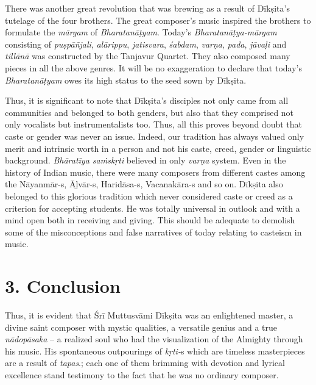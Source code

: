 There was another great revolution that was brewing as a result of Dīkṣita’s tutelage of the four brothers. The great composer’s music inspired the brothers to formulate the \textit{mārgam} of \textit{Bharatanāṭyam}. Today’s \textit{Bharatanāṭya-mārgam} consisting of \textit{puṣpāñjali}, \textit{alārippu}, \textit{jatisvara}, \textit{śabdam}, \textit{varṇa}, \textit{pada}, \textit{jāvaḷi} and \textit{tillānā} was constructed by the Tanjavur Quartet. They also composed many pieces in all the above genres. It will be no exaggeration to declare that today’s \textit{Bharatanāṭyam} owes its high status to the seed sown by Dīkṣita.

Thus, it is significant to note that Dīkṣita's disciples not only came from all communities and belonged to both genders, but also that they comprised not only vocalists but instrumentalists too. Thus, all this proves beyond doubt that caste or gender was never an issue. Indeed, our tradition has always valued only merit and intrinsic worth in a person and not his caste, creed, gender or linguistic background. \textit{Bhāratīya saṁskṛti} believed in only \textit{varṇa} system. Even in the history of Indian music, there were many composers from different castes among the Nāyanmār-s, Āḻvār-s, Haridāsa-s, Vacanakāra-s and so on. Dīkṣita also belonged to this glorious tradition which never considered caste or creed as a criterion for accepting students. He was totally universal in outlook and with a mind open both in receiving and giving. This should be adequate to demolish some of the misconceptions and false narratives of today relating to casteism in music.

\vspace{-.3cm}

\section*{3. Conclusion}

Thus, it is evident that Śrī Muttusvāmi Dīkṣita was an enlightened master, a divine saint composer with mystic qualities, a versatile genius and a true \textit{nādopāsaka} – a realized soul who had the visualization of the Almighty through his music. His spontaneous outpourings of \textit{kṛti-}s which are timeless masterpieces are a result of \textit{tapas}.; each one of them brimming with devotion and lyrical excellence stand testimony to the fact that he was no ordinary composer.

